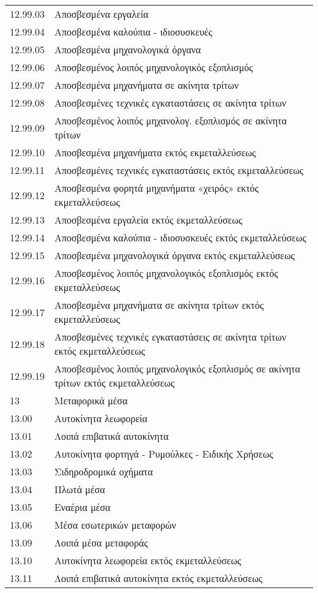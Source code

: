 \documentclass[A4,10pt,greek]{book}
\begin{document}
\begin{tabularx}{\linewidth}{lX}
12.99.03 & Αποσβεσμένα εργαλεία\\
12.99.04 & Αποσβεσμένα καλούπια - ιδιοσυσκευές\\
12.99.05 & Αποσβεσμένα μηχανολογικά όργανα\\
12.99.06 & Αποσβεσμένος λοιπός μηχανολογικός εξοπλισμός\\
12.99.07 & Αποσβεσμένα μηχανήματα σε ακίνητα τρίτων\\
12.99.08 & Αποσβεσμένες τεχνικές εγκαταστάσεις σε ακίνητα τρίτων\\
12.99.09 & Αποσβεσμένος λοιπός μηχανολογ. εξοπλισμός σε ακίνητα τρίτων\\
12.99.10 & Αποσβεσμένα μηχανήματα εκτός εκμεταλλεύσεως\\
12.99.11 & Αποσβεσμένες τεχνικές εγκαταστάσεις εκτός εκμεταλλεύσεως\\
12.99.12 & Αποσβεσμένα φορητά μηχανήματα «χειρός» εκτός εκμεταλλεύσεως\\
12.99.13 & Αποσβεσμένα εργαλεία εκτός εκμεταλλεύσεως\\
12.99.14 & Αποσβεσμένα καλούπια - ιδιοσυσκευές εκτός εκμεταλλεύσεως\\
12.99.15 & Αποσβεσμένα μηχανολογικά όργανα εκτός εκμεταλλεύσεως\\
12.99.16 & Αποσβεσμένος λοιπός μηχανολογικός εξοπλισμός εκτός εκμεταλλεύσεως\\
12.99.17 & Αποσβεσμένα μηχανήματα σε ακίνητα τρίτων εκτός εκμεταλλεύσεως\\
12.99.18 & Αποσβεσμένες τεχνικές εγκαταστάσεις σε ακίνητα τρίτων εκτός εκμεταλλεύσεως\\
12.99.19 & Αποσβεσμένος λοιπός μηχανολογικός εξοπλισμός σε ακίνητα τρίτων εκτός εκμεταλλεύσεως\\
13 & Μεταφορικά μέσα\\
13.00 & Αυτοκίνητα λεωφορεία\\
13.01 & Λοιπά επιβατικά αυτοκίνητα\\
13.02 & Αυτοκίνητα φορτηγά - Ρυμούλκες - Ειδικής Χρήσεως\\
13.03 & Σιδηροδρομικά οχήματα\\
13.04 & Πλωτά μέσα\\
13.05 & Εναέρια μέσα\\
13.06 & Μέσα εσωτερικών μεταφορών\\
13.09 & Λοιπά μέσα μεταφοράς\\
13.10 & Αυτοκίνητα λεωφορεία εκτός εκμεταλλεύσεως\\
13.11 & Λοιπά επιβατικά αυτοκίνητα εκτός εκμεταλλεύσεως\\

\end{tabularx}
\end{document}

